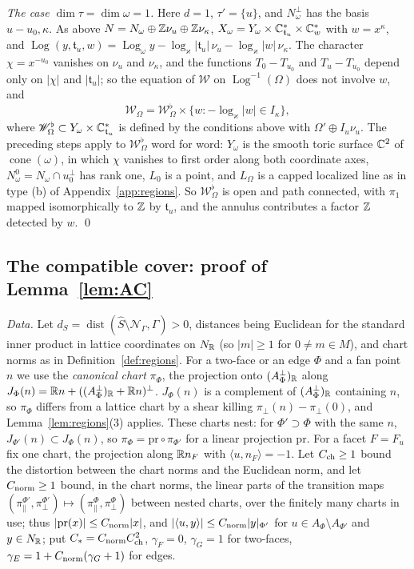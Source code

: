 \emph{The case $\dim\tau=\dim\omega=1$.} Here $d=1$, $\tau'=\{u\}$, and $N_\omega^\perp$ has the basis $u-u_0,\kappa$. As above $N=N_\omega\oplus\mathbb Z\nu_u\oplus\mathbb Z\nu_\kappa$, $X_\omega=Y_\omega\times\mathbb C^*_{\mathfrak t_u}\times\mathbb C^*_w$ with $w=x^\kappa$, and $\operatorname{Log}(y,\mathfrak t_u,w)=\operatorname{Log}_\omega y-\log_\varkappa|\mathfrak t_u|\,\nu_u-\log_\varkappa|w|\,\nu_\kappa$. The character $\chi=x^{-u_0}$ vanishes on $\nu_u$ and $\nu_\kappa$, and the functions $T_0-T_{u_0}$ and $T_u-T_{u_0}$ depend only on $|\chi|$ and $|\mathfrak t_u|$; so the equation of $\mathscr W$ on $\operatorname{Log}^{-1}(\Omega)$ does not involve $w$, and
\[
\mathscr W_\Omega=\mathscr W_\Omega^\flat\times\{w:-\log_\varkappa|w|\in I_\kappa\},
\]
where $\mathscr W_\Omega^\flat\subset Y_\omega\times\mathbb C^*_{\mathfrak t_u}$ is defined by the conditions above with $\Omega'\oplus I_u\nu_u$. The preceding steps apply to $\mathscr W_\Omega^\flat$ word for word: $Y_\omega$ is the smooth toric surface $\mathbb C^2$ of $\operatorname{cone}(\omega)$, in which $\chi$ vanishes to first order along both coordinate axes, $N^0_\omega=N_\omega\cap u_0^\perp$ has rank one, $L_0$ is a point, and $L_\Omega$ is a capped localized line as in type (b) of Appendix~\ref{app:regions}. So $\mathscr W_\Omega^\flat$ is open and path connected, with $\pi_1$ mapped isomorphically to $\mathbb Z$ by $\mathfrak t_u$, and the annulus contributes a factor $\mathbb Z$ detected by $w$. \qed

\subsection{The compatible cover: proof of Lemma~\ref{lem:AC}}\label{app:AC}
\emph{Data.} Let $d_S=\operatorname{dist}(\hat S\setminus \mathcal N_\Gamma,\widehat\Gamma)>0$, distances being Euclidean for the standard inner product in lattice coordinates on $N_\mathbb R$ (so $|m|\ge1$ for $0\neq m\in M$), and chart norms as in Definition~\ref{def:regions}. For a two-face or an edge $\Phi$ and a fan point $n$ we use the \emph{canonical chart} $\pi_\Phi$, the projection onto $(A_\Phi^\perp)_\mathbb R$ along $J_\Phi(n)=\mathbb R n+((A_\Phi^\perp)_\mathbb R+\mathbb R n)^\perp$. $J_\Phi(n)$ is a complement of $(A_\Phi^\perp)_\mathbb R$ containing $n$, so $\pi_\Phi$ differs from a lattice chart by a shear killing $\pi_\perp(n)-\pi_\perp(0)$, and Lemma~\ref{lem:regions}(3) applies. These charts nest: for $\Phi'\supset\Phi$ with the same $n$, $J_{\Phi'}(n)\subset J_\Phi(n)$, so $\pi_\Phi=\mathrm{pr}\circ \pi_{\Phi'}$ for a linear projection $\mathrm{pr}$. For a facet $F=F_u$ fix one chart, the projection along $\mathbb R n_F$ with $\langle u,n_F\rangle=-1$. Let $C_{\rm ch}\ge1$ bound the distortion between the chart norms and the Euclidean norm, and let $C_{\rm norm}\ge1$ bound, in the chart norms, the linear parts of the transition maps $(\pi^{\Phi'}_\parallel,\pi^{\Phi'}_\perp)\mapsto(\pi^\Phi_\parallel,\pi^\Phi_\perp)$ between nested charts, over the finitely many charts in use; thus $|\mathrm{pr}(x)|\le C_{\rm norm}|x|$, and $|\langle u,y\rangle|\le C_{\rm norm}|y|_{\Phi'}$ for $u\in A_\Phi\setminus A_{\Phi'}$ and $y\in N_\mathbb R$; put $C_*=C_{\rm norm}C_{\rm ch}^2$, $\gamma_F=0$, $\gamma_G=1$ for two-faces, $\gamma_E=1+C_{\rm norm}(\gamma_G+1)$ for edges.

